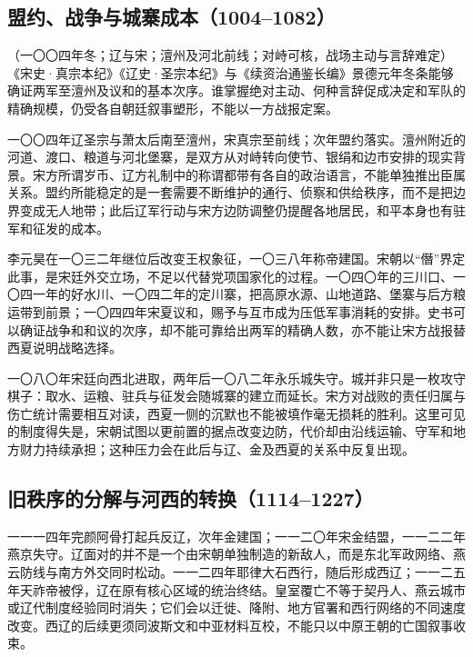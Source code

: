 \subsection{盟约、战争与城寨成本（1004--1082）}

\label{evt:liao-xia-chanyuan}
\begin{event}{（一〇〇四年冬；辽与宋；澶州及河北前线；对峙可核，战场主动与言辞难定）}
《宋史·真宗本纪》《辽史·圣宗本纪》与《续资治通鉴长编》景德元年冬条能够确证两军至澶州及议和的基本次序。谁掌握绝对主动、何种言辞促成决定和军队的精确规模，仍受各自朝廷叙事塑形，不能以一方战报定案。
\end{event}
一〇〇四年辽圣宗与萧太后南至澶州，宋真宗至前线；次年盟约落实。澶州附近的河道、渡口、粮道与河北堡寨，是双方从对峙转向使节、银绢和边市安排的现实背景。宋方所谓岁币、辽方礼制中的称谓都带有各自的政治语言，不能单独推出臣属关系。盟约所能稳定的是一套需要不断维护的通行、侦察和供给秩序，而不是把边界变成无人地带；此后辽军行动与宋方边防调整仍提醒各地居民，和平本身也有驻军和征发的成本。

李元昊在一〇三二年继位后改变王权象征，一〇三八年称帝建国。宋朝以“僭”界定此事，是宋廷外交立场，不足以代替党项国家化的过程。一〇四〇年的三川口、一〇四一年的好水川、一〇四二年的定川寨，把高原水源、山地道路、堡寨与后方粮运带到前景；一〇四四年宋夏议和，赐予与互市成为压低军事消耗的安排。史书可以确证战争和和议的次序，却不能可靠给出两军的精确人数，亦不能让宋方战报替西夏说明战略选择。

一〇八〇年宋廷向西北进取，两年后一〇八二年永乐城失守。城并非只是一枚攻守棋子：取水、运粮、驻兵与征发会随城寨的建立而延长。宋方对战败的责任归属与伤亡统计需要相互对读，西夏一侧的沉默也不能被填作毫无损耗的胜利。这里可见的制度得失是，宋朝试图以更前置的据点改变边防，代价却由沿线运输、守军和地方财力持续承担；这种压力会在此后与辽、金及西夏的关系中反复出现。

\subsection{旧秩序的分解与河西的转换（1114--1227）}

一一一四年完颜阿骨打起兵反辽，次年金建国；一一二〇年宋金结盟，一一二二年燕京失守。辽面对的并不是一个由宋朝单独制造的新敌人，而是东北军政网络、燕云防线与南方外交同时松动。一一二四年耶律大石西行，随后形成西辽；一一二五年天祚帝被俘，辽在原有核心区域的统治终结。皇室覆亡不等于契丹人、燕云城市或辽代制度经验同时消失；它们会以迁徙、降附、地方官署和西行网络的不同速度改变。西辽的后续更须同波斯文和中亚材料互校，不能只以中原王朝的亡国叙事收束。

